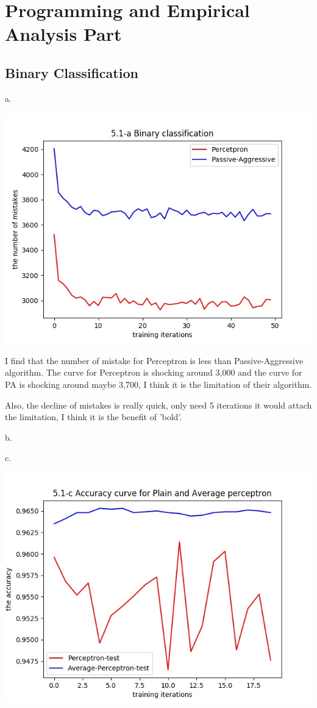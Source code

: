 \documentclass[12pt]{article}
\begin{document}
 	\section{Programming and Empirical Analysis Part}
		\subsection {Binary Classification}
			\par a.	\par\includegraphics[height=10cm] {part1_a}
			\par I find that the number of mistake for Perceptron is less than Passive-Aggressive algorithm. The curve for Perceptron is shocking around 3,000  and the curve for PA is shocking around maybe 3,700, I think it is the limitation of their algorithm. 
			\par Also, the decline of mistakes is really quick, only need 5 iterations it would attach the limitation, I think it is the benefit of 'bold'.
			\par b.
			\par c.	\par\includegraphics[height=10cm] {part1_c}
\end{document}
